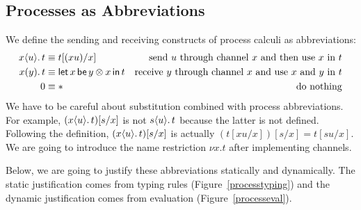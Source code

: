     \subsection{Processes as Abbreviations}

    We define the sending and receiving constructs of process calculi as
    abbreviations:
    \begin{align*}
     {x}\langle{u}\rangle.\,{t} &\equiv t[(xu) /x] &\text{send $u$ through channel
     $x$ and then use $x$ in $t$} \\
     {{x}({y}).\,{t}} &\equiv \mathsf{let }\,{x}\,\mathsf{ be }\,{y\otimes x}\,\mathsf{ in }\,{t} & \text{receive
     $y$ through channel $x$ and use $x$ and $y$ in $t$} \\
     0 &\equiv \ast &\text{do nothing}
    \end{align*}
    We have to be careful about substitution combined with process
    abbreviations.
    For example, $({x}\langle{u}\rangle.\,{t})[s/x]$ is not ${s}\langle{u}\rangle.\,{t}$
    because the latter is not defined.  Following the definition,
    $({x}\langle{u}\rangle.\,{t})[s/x]$ is actually $(t[xu/x])[s/x] = t[su/x]$.
    We are going to introduce the name restriction $\nu x.t$ after
    implementing channels.

    Below, we are going to justify these abbreviations statically and
    dynamically.
    The static justification comes from typing rules
    (Figure~\ref{processtyping}) and the dynamic justification comes from
    evaluation (Figure~\ref{processeval}).

